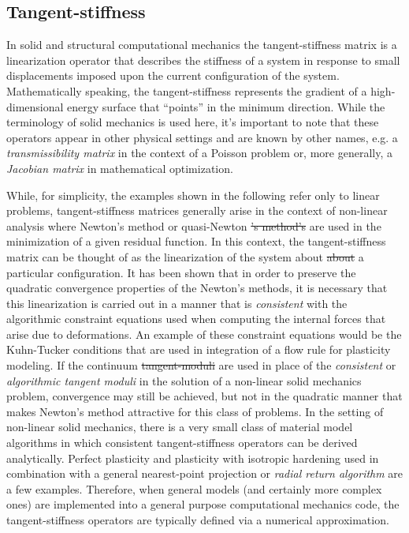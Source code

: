 \documentclass[preprint,12pt]{elsarticle}
\providecommand{\DIFaddtex}[1]{{\protect\color{blue}\uwave{#1}}} %
\providecommand{\DIFdeltex}[1]{{\protect\color{red}\sout{#1}}}                      %
\providecommand{\DIFaddbegin}{} %
\providecommand{\DIFaddend}{} %
\providecommand{\DIFdelbegin}{} %
\providecommand{\DIFdelend}{} %
\providecommand{\DIFadd}[1]{\texorpdfstring{\DIFaddtex{#1}}{#1}} %
\providecommand{\DIFdel}[1]{\texorpdfstring{\DIFdeltex{#1}}{}} %
\begin{document}
\subsection{Tangent-stiffness} 
\DIFaddbegin \label{subsec:TS}
\DIFaddend 

In solid and structural computational mechanics the tangent-stiffness matrix is a linearization operator that describes the stiffness of a system in response to small displacements imposed upon the current configuration of the system.  Mathematically speaking, the tangent-stiffness represents the gradient of a high-dimensional energy surface that ``points'' in the minimum direction. While the terminology of solid mechanics is used here, it's important to note that
these operators appear in other physical settings and are known by other names, e.g. a \emph{transmissibility matrix} in the context of a Poisson problem or, more generally, a \emph{Jacobian matrix} in mathematical optimization.

While, for simplicity, the examples shown in the following refer only to linear problems, tangent-stiffness matrices generally arise in the context of non-linear analysis where Newton's method or quasi-Newton \DIFdelbegin \DIFdel{'s method's }\DIFdelend \DIFaddbegin \DIFadd{methods }\DIFaddend are used in the minimization of a given residual function.  In this context, the tangent-stiffness matrix can be thought of as the linearization of the system
about \DIFdelbegin \DIFdel{about }\DIFdelend a particular configuration.  It has been shown \cite{hughes1978consistent,hughes1978unconditionally} that in order to preserve the quadratic convergence properties of the Newton's methods, it is necessary that this linearization is carried out in a manner that is \emph{consistent} with the algorithmic constraint equations used when computing the internal forces that arise due to deformations.  An example of these constraint equations would be the Kuhn-Tucker conditions \cite{simo1998} that are used in integration of a flow rule for plasticity modeling.  If the continuum \DIFdelbegin \DIFdel{tangent-moduli }\DIFdelend \DIFaddbegin \DIFadd{tangent-modulii }\DIFaddend are used in place of the \emph{consistent} or \emph{algorithmic tangent moduli} in the solution of a non-linear solid mechanics problem, convergence may still be achieved, but not in the quadratic manner that makes Newton's method attractive for this class of problems.  In the setting of non-linear solid mechanics, there is a very small class of material model algorithms in which consistent tangent-stiffness operators can be derived analytically.  Perfect plasticity and plasticity with isotropic hardening used in combination with a general nearest-point projection or \emph{radial return algorithm} are a few examples.  Therefore, when general models (and certainly more complex ones) are implemented into a general purpose computational mechanics code, the tangent-stiffness operators are typically defined via a numerical approximation.  
\end{document}
